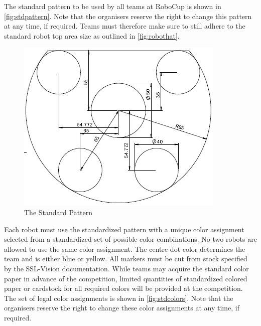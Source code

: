 The standard pattern to be used by all teams at RoboCup is shown in \autoref{fig:stdpattern}.
Note that the organisers reserve the right to change this pattern at any time, if required.
Teams must therefore make sure to still adhere to the standard robot top area size as outlined in \autoref{fig:robothat}.

\begin{figure}[ht] %
	\centering
	\includegraphics[width=0.8\columnwidth]{img/standard_pattern2010.png}
	\caption{The Standard Pattern}
	\label{fig:stdpattern}
\end{figure}

Each robot must use the standardized pattern with a unique color assignment
selected from a standardized set of possible color combinations.
No two robots are allowed to use the same color assignment.
The centre dot color determines the team and is either blue or yellow.
All markers must be cut from stock specified by the SSL-Vision
documentation. While teams may acquire the standard color paper in advance of
the competition, limited quantities of standardized colored paper or cardstock for 
all required colors will be provided at the competition.
The set of legal color assignments is shown in \autoref{fig:stdcolors}.
Note that the organisers reserve the right to change these color assignments at
any time, if required.

